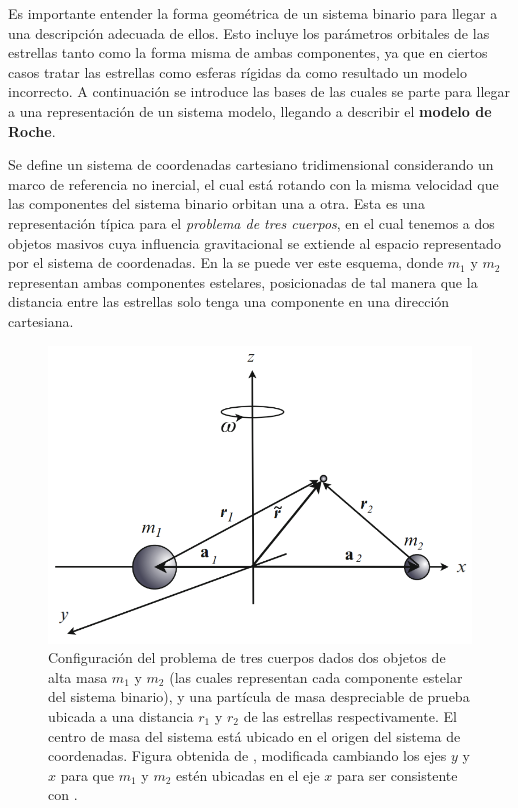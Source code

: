 Es importante entender la forma geométrica de un sistema binario para llegar a
una descripción adecuada de ellos. Esto incluye los parámetros orbitales de las
estrellas tanto como la forma misma de ambas componentes, ya que en ciertos
casos tratar las estrellas como esferas rígidas da como resultado un modelo
incorrecto. A continuación se introduce las bases de las cuales se parte para
llegar a una representación de un sistema modelo, llegando a describir el
\textbf{modelo de Roche}.

Se define un sistema de coordenadas cartesiano tridimensional considerando un
marco de referencia no inercial, el cual está rotando con la misma velocidad que
las componentes del sistema binario orbitan una a otra. Esta es una
representación típica para el \textit{problema de tres cuerpos}, en el cual
tenemos a dos objetos masivos cuya influencia gravitacional se extiende al
espacio representado por el sistema de coordenadas. En la
 se puede ver este esquema, donde $m_1$ y $m_2$
representan ambas componentes estelares, posicionadas de tal manera que la
distancia entre las estrellas solo tenga una componente en una dirección
cartesiana.

\begin{figure}[!ht]
	\centering
	\includegraphics[scale=0.6]{Introduccion/Figures/Figura Tres Cuerpos_Intro Evolution Single Binary Stars.png}
	\caption{Configuración del problema de tres cuerpos dados dos objetos de
	alta masa $m_1$ y $m_2$ (las cuales representan cada componente estelar del
	sistema binario), y una partícula de masa despreciable de prueba ubicada a
	una distancia $r_1$ y $r_2$ de las estrellas respectivamente. El centro de
	masa del sistema está ubicado en el origen del sistema de coordenadas.
	Figura obtenida de
	,
	modificada cambiando los ejes $y$ y $x$ para que $m_1$ y $m_2$ estén
	ubicadas en el eje $x$ para ser consistente con
	.}
	\label{figuraTresCuerpos}
\end{figure}

